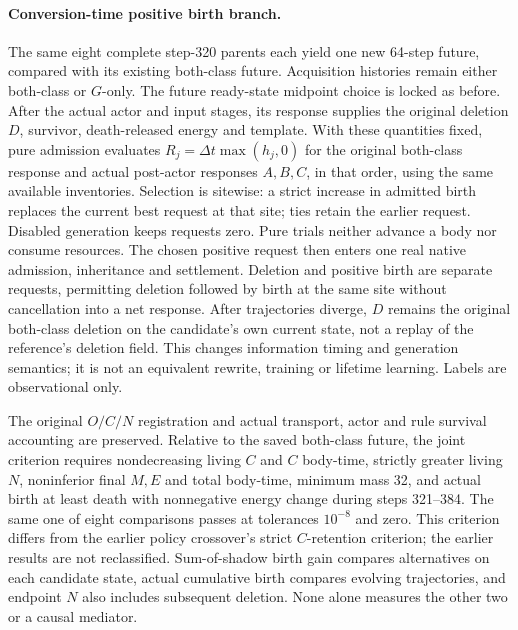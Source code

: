 \paragraph{Conversion-time positive birth branch.}The same eight complete step-320 parents each yield one new 64-step future, compared with its existing both-class future. Acquisition histories remain either both-class or $G$-only. The future ready-state midpoint choice is locked as before. After the actual actor and input stages, its response supplies the original deletion $D$, survivor, death-released energy and template. With these quantities fixed, pure admission evaluates $R_j=\Delta t\max(h_j,0)$ for the original both-class response and actual post-actor responses $A,B,C$, in that order, using the same available inventories. Selection is sitewise: a strict increase in admitted birth replaces the current best request at that site; ties retain the earlier request. Disabled generation keeps requests zero. Pure trials neither advance a body nor consume resources. The chosen positive request then enters one real native admission, inheritance and settlement. Deletion and positive birth are separate requests, permitting deletion followed by birth at the same site without cancellation into a net response. After trajectories diverge, $D$ remains the original both-class deletion on the candidate's own current state, not a replay of the reference's deletion field. This changes information timing and generation semantics; it is not an equivalent rewrite, training or lifetime learning. Labels are observational only.

The original $O/C/N$ registration and actual transport, actor and rule survival accounting are preserved. Relative to the saved both-class future, the joint criterion requires nondecreasing living $C$ and $C$ body-time, strictly greater living $N$, noninferior final $M,E$ and total body-time, minimum mass 32, and actual birth at least death with nonnegative energy change during steps 321--384. The same one of eight comparisons passes at tolerances $10^{-8}$ and zero. This criterion differs from the earlier policy crossover's strict $C$-retention criterion; the earlier results are not reclassified. Sum-of-shadow birth gain compares alternatives on each candidate state, actual cumulative birth compares evolving trajectories, and endpoint $N$ also includes subsequent deletion. None alone measures the other two or a causal mediator.

